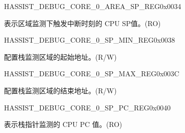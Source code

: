 \begin{register}{H}{ASSIST\_DEBUG\_CORE\_0\_AREA\_SP\_REG}{0x0034}\label{regdesc:ASSISTDEBUGCORE0AREASPREG}
%
\regnewline%
\begin{regdesc}\begin{reglist}
\label{fielddesc:ASSISTDEBUGCORE0AREASP}\item [ASSIST\_DEBUG\_CORE\_0\_AREA\_SP] 表示区域监测下触发中断时刻的 CPU SP值。(RO)
\end{reglist}\end{regdesc}
\end{register}


\begin{register}{H}{ASSIST\_DEBUG\_CORE\_0\_SP\_MIN\_REG}{0x0038}\label{regdesc:ASSISTDEBUGCORE0SPMINREG}
%
\regnewline%
\begin{regdesc}\begin{reglist}
\label{fielddesc:ASSISTDEBUGCORE0SPMIN}\item [ASSIST\_DEBUG\_CORE\_0\_SP\_MIN] 配置栈监测区域的起始地址。(R/W)
\end{reglist}\end{regdesc}
\end{register}


\begin{register}{H}{ASSIST\_DEBUG\_CORE\_0\_SP\_MAX\_REG}{0x003C}\label{regdesc:ASSISTDEBUGCORE0SPMAXREG}
%
\regnewline%
\begin{regdesc}\begin{reglist}
\label{fielddesc:ASSISTDEBUGCORE0SPMAX}\item [ASSIST\_DEBUG\_CORE\_0\_SP\_MAX] 配置栈监测区域的结束地址。(R/W)
\end{reglist}\end{regdesc}
\end{register}


\begin{register}{H}{ASSIST\_DEBUG\_CORE\_0\_SP\_PC\_REG}{0x0040}\label{regdesc:ASSISTDEBUGCORE0SPPCREG}
%
\regnewline%
\begin{regdesc}\begin{reglist}
\label{fielddesc:ASSISTDEBUGCORE0SPPC}\item [ASSIST\_DEBUG\_CORE\_0\_SP\_PC] 表示栈指针监测的 CPU PC 值。(RO)
\end{reglist}\end{regdesc}
\end{register}


